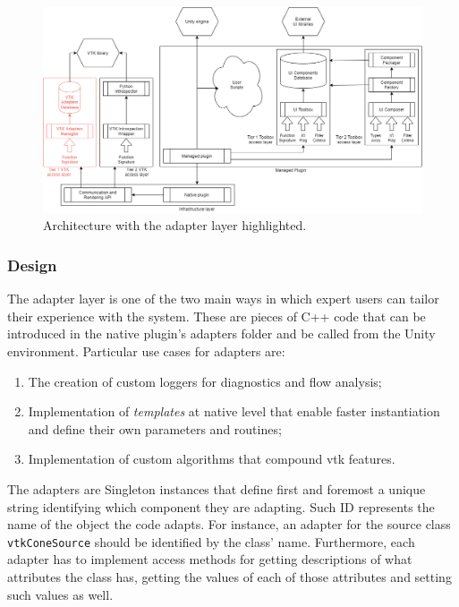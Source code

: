 \begin{figure}[!t]
    \centering
    \includegraphics[width=\textwidth]{pictures/Architecture-v0.3-adapt.png}
    \caption{Architecture with the adapter layer highlighted.}
    \label{fig:arch-adapt}
\end{figure}

\subsubsection{Design}

The adapter layer is one of the two main ways in which expert users can tailor their experience with the system. These are pieces of C++ code that can be introduced in the native plugin's adapters folder and be called from the Unity environment. Particular use cases for adapters are:

\begin{enumerate}
    \item The creation of custom loggers for diagnostics and flow analysis;
    \item Implementation of \textit{templates} at native level that enable faster instantiation and define their own parameters and routines;
    \item Implementation of custom algorithms that compound \acrshort{vtk} features.
\end{enumerate}

The adapters are Singleton instances that define first and foremost a unique string identifying which component they are adapting. Such ID represents the name of the object the code adapts. For instance, an adapter for the  source class \verb|vtkConeSource| should be identified by the class' name. Furthermore, each adapter has to implement access methods for getting descriptions of what attributes the class has, getting the values of each of those attributes and setting such values as well. 

